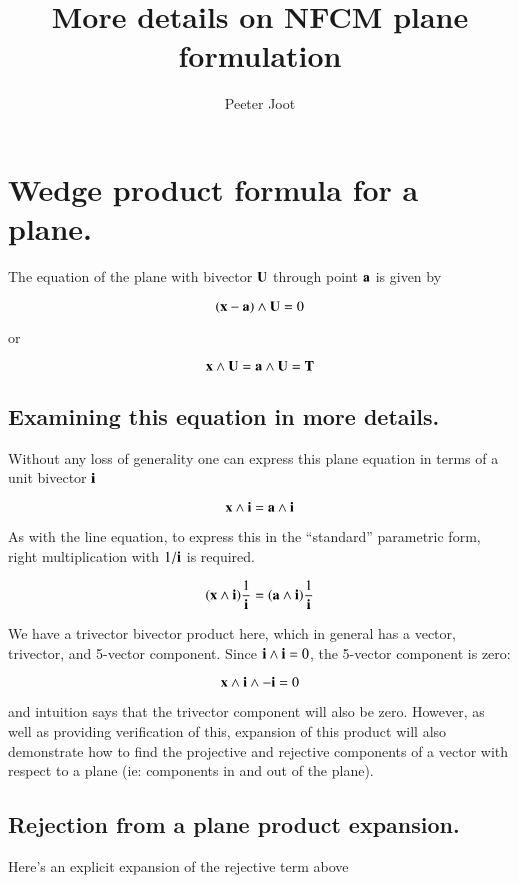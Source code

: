 \documentclass{article}
\title{More details on NFCM plane formulation} %
\author{Peeter Joot}         %
\begin{document}


\section{Wedge product formula for a plane.}

The equation of the plane with bivector $\mathbf{U}$ through point $\mathbf{a}$ is given
by

\[
(\mathbf{x} - \mathbf{a}) \wedge \mathbf{U} = 0
\]

or

\[
\mathbf{x} \wedge \mathbf{U} = \mathbf{a} \wedge \mathbf{U} = \mathbf{T}
\]

\subsection{ Examining this equation in more details. }

Without any loss of generality one can express this plane equation
in terms of a unit bivector $\mathbf{i}$

\[
\mathbf{x} \wedge \mathbf{i} = \mathbf{a} \wedge \mathbf{i}
\]

As with the line equation, to express this in the ``standard'' parametric
form, right multiplication with $1/\mathbf{i}$ is required.

\[
(\mathbf{x} \wedge \mathbf{i})\frac{1}{\mathbf{i}} = (\mathbf{a} \wedge \mathbf{i})\frac{1}{\mathbf{i}}
\]

We have a trivector bivector product here, which in general has a vector,
trivector, and 5-vector component.  Since $\mathbf{i} \wedge \mathbf{i} = 0$, the
5-vector component is zero:

\[
\mathbf{x} \wedge \mathbf{i} \wedge -\mathbf{i} = 0
\]

and intuition says that the trivector component will also be zero.  However,
as well as providing verification of this, expansion of this product will also
demonstrate how to find the projective and rejective components of a vector
with respect to a plane (ie: components in and out of the plane).

\subsection{Rejection from a plane product expansion.}

Here's an explicit expansion of the rejective term above
\end{document}
